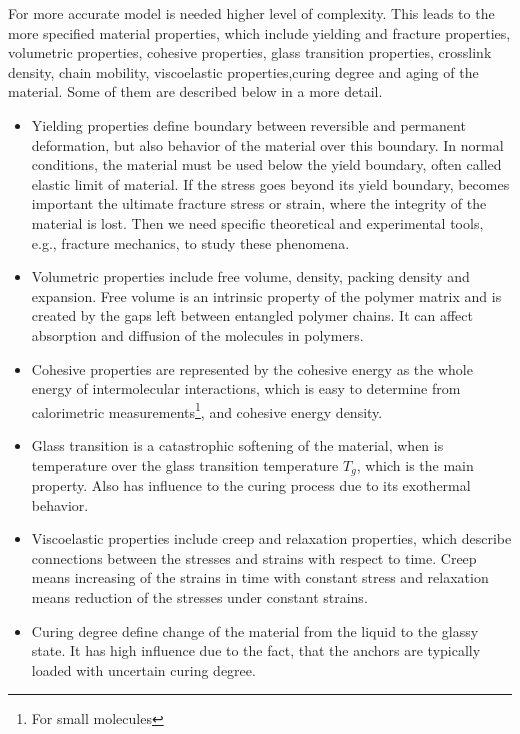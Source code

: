 For more accurate model is needed higher level of complexity. This leads to the more specified material properties, which include yielding and fracture properties, volumetric properties, cohesive properties, glass transition properties, crosslink density, chain mobility, viscoelastic properties,curing degree and aging of the material. Some of them are described below in a more detail.	

\begin{itemize}
	\item 	Yielding properties define boundary between reversible and permanent deformation, but also behavior of the material over this boundary. In normal conditions, the material must be used below the yield boundary, often called elastic limit of material. 
	If the stress goes beyond its yield boundary, becomes important the ultimate fracture stress or strain, where the integrity of the material is lost. Then we need specific theoretical and experimental tools, e.g., fracture mechanics, to study these phenomena.
	
	\item Volumetric properties include free volume, density, packing density and expansion. Free volume is an intrinsic property of the polymer matrix and is created by the gaps left between entangled polymer chains. It can affect absorption and diffusion of the molecules in polymers.
	
	\item Cohesive properties are represented by the cohesive energy as the whole energy of intermolecular interactions, which is easy to determine from calorimetric measurements\footnote{For small molecules}, and cohesive energy density.
	
	\item Glass transition is a catastrophic softening of the material, when is temperature over the glass transition temperature $T_g$, which is the main property. Also has influence to the curing process due to its exothermal behavior. 
	
	\item Viscoelastic properties include creep and relaxation properties, which describe connections between the stresses and strains with respect to time. Creep means increasing of the strains in time with constant stress and relaxation means reduction of the stresses under constant strains. 
	
	\item Curing degree define change of the material from the liquid to the glassy state. It has high influence due to the fact, that the anchors are typically loaded with uncertain curing degree.  
	
\end{itemize}


